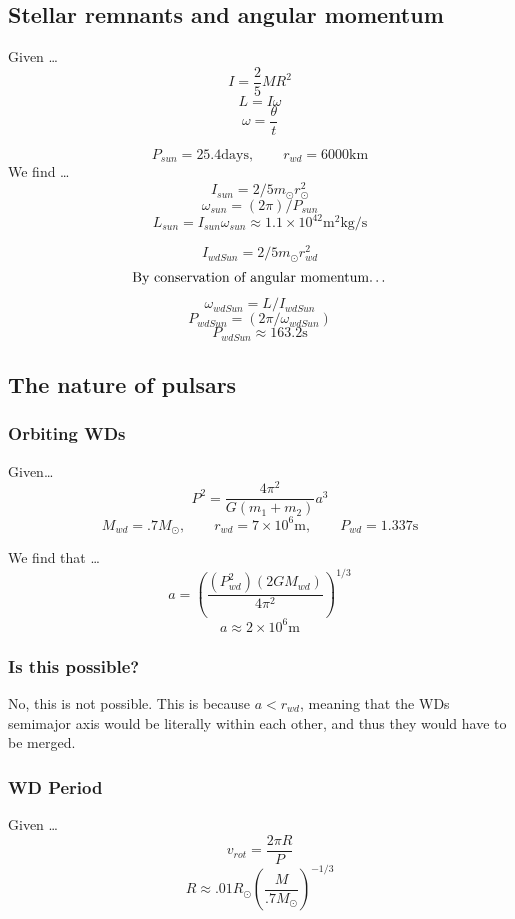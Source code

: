 \documentclass{article}
\newenvironment{codeblockPython}
    {\VerbatimEnvironment
     \begin{codecell}
     \begin{Verbatim}}
    {\end{Verbatim}
     \end{codecell}}
\newenvironment{codeblockPython}
    {\VerbatimEnvironment
     \begin{codecell}
     \begin{verbatim}}
    {\end{verbatim}
     \end{codecell}}
\begin{document}


\subsection{Stellar remnants and angular momentum}
Given \dots
\[I = \frac{2}{5} MR^2\]
\[L = I\omega\]
\[\omega = \frac{\theta}{t}\]

\[P_{sun} = 25.4 \text{days}, \qquad r_{wd} = 6000 \text{km}\]
We find \dots
\[I_{sun} = 2/5 m_\odot r_\odot^2\]
\[\omega_{sun} = (2 \pi)/P_{sun} \]
\[L_{sun} = I_{sun}\omega_{sun} \approx  1.1\times 10^{42}\text{m}^2\text{kg}/\text{s}\]

\[I_{wdSun} = 2/5 m_\odot r_{wd}^2\]
\[\text{By conservation of angular momentum\dots}\]
\[\omega_{wdSun} = L/I_{wdSun}\]
\[P_{wdSun} = (2 \pi / \omega_{wdSun})\]
\[\boxed{P_{wdSun} \approx 163.2\text{s}}\]

\subsection{The nature of pulsars}
\subsubsection{Orbiting WDs}
Given\dots
\[P^2 = \frac{4\pi^2}{G(m_1 + m_2)} a^3 \]
\[M_{wd} = .7M_\odot, \qquad r_{wd} = 7 \times 10^6 \text{m}, \qquad P_{wd} = 1.337 \text{s}\]

We find that \dots
\[a = \left(\frac{(P_{wd}^2)(2GM_{wd})}{4\pi^2}\right)^{1/3}\]
\[\boxed{a \approx 2\times 10^6 \text{m}}\]
\subsubsection{Is this possible?}
No, this is not possible. This is because \(\boxed{a < r_{wd}}\), meaning that the WDs semimajor axis would be literally within each other, and thus they would have to be merged. 

\subsubsection{WD Period}
Given \dots
\[v_{rot}= \frac{2\pi R}{P}\]
\[R \approx .01R_\odot \left(\frac{M}{.7M_\odot}\right)^{-1/3}\]
\end{document}
